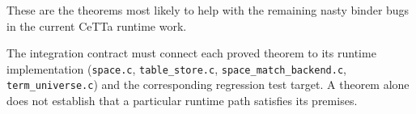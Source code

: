 \documentclass[11pt]{article}
\newcommand{\CeTTa}{\textup{CeTTa}}
\begin{document}
These are the theorems most likely to help with the remaining nasty
binder bugs in the current \CeTTa{} runtime work.

The integration contract must connect each proved theorem to its runtime
implementation (\texttt{space.c}, \texttt{table\_store.c},
\texttt{space\_match\_backend.c}, \texttt{term\_universe.c}) and the
corresponding regression test target. A theorem alone does not establish
that a particular runtime path satisfies its premises.
\end{document}
